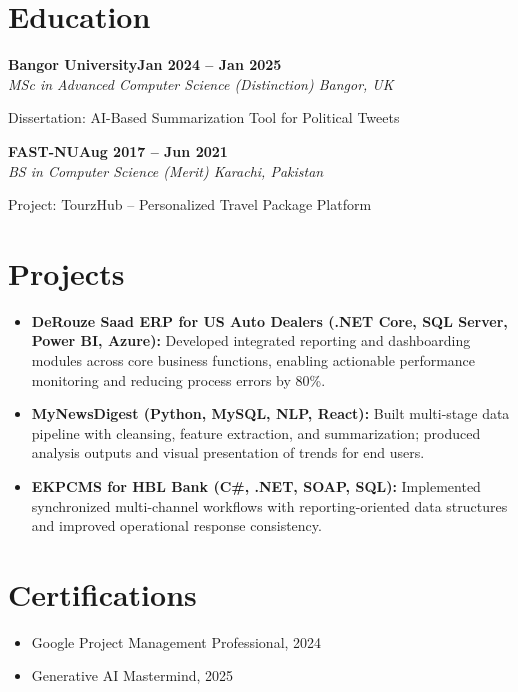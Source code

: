 \documentclass[letterpaper,10pt]{article}
\newcommand{\headingBf}[2]{
  \hspace{10pt}\textbf{#1}\hfill\textbf{#2}\\
}
\newcommand{\headingIt}[2]{
  \hspace{10pt}\textit{#1}\hfill\textit{#2}\\
}
\newenvironment{resume_list}{
  \vspace{-7pt}
  \begin{itemize}[itemsep=-2px, parsep=1pt, leftmargin=30pt]
}{
  \end{itemize}
}
\begin{document}
\section{Education}

\headingBf{Bangor University}{Jan 2024 -- Jan 2025}
\headingIt{MSc in Advanced Computer Science (Distinction) \hfill Bangor, UK}{}
\begin{resume_list}
    \item Dissertation: AI-Based Summarization Tool for Political Tweets
\end{resume_list}

\headingBf{FAST-NU}{Aug 2017 -- Jun 2021}
\headingIt{BS in Computer Science (Merit) \hfill Karachi, Pakistan}{}
\begin{resume_list}
    \item Project: TourzHub -- Personalized Travel Package Platform
\end{resume_list}

\section{Projects}
\begin{itemize}
    \setlength\itemsep{3pt}
    \item \textbf{DeRouze Saad ERP for US Auto Dealers (.NET Core, SQL Server, Power BI, Azure):} Developed integrated reporting and dashboarding modules across core business functions, enabling actionable performance monitoring and reducing process errors by 80\%.
    \item \textbf{MyNewsDigest (Python, MySQL, NLP, React):} Built multi-stage data pipeline with cleansing, feature extraction, and summarization; produced analysis outputs and visual presentation of trends for end users.
    \item \textbf{EKPCMS for HBL Bank (C\#, .NET, SOAP, SQL):} Implemented synchronized multi-channel workflows with reporting-oriented data structures and improved operational response consistency.
\end{itemize}

\section{Certifications}
\begin{itemize}
    \item Google Project Management Professional, 2024
    \item Generative AI Mastermind, 2025
\end{itemize}

\vspace*{\fill}
\end{document}

